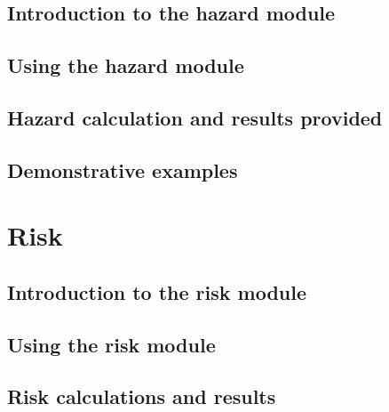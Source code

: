 \documentclass[12pt,a4paper,headings=small,version=last,dvips]{scrbook}
\begin{document}
\chapter{Introduction to the hazard module}
    \label{chap:oqhazintro}
	
    
    
\chapter{Using the hazard module}
	\label{chap:hazinp}
	
\chapter{Hazard calculation and results provided}
	\label{chap:hazout}
	
\chapter{Demonstrative examples}
	\label{chap:hazdemo}
	
\part{Risk}
\chapter{Introduction to the risk module}
	
\chapter{Using the risk module}
	\label{chap:riskmodule}
	
\chapter{Risk calculations and results}	
	\label{chap:riskout}
	
%
\end{document}
